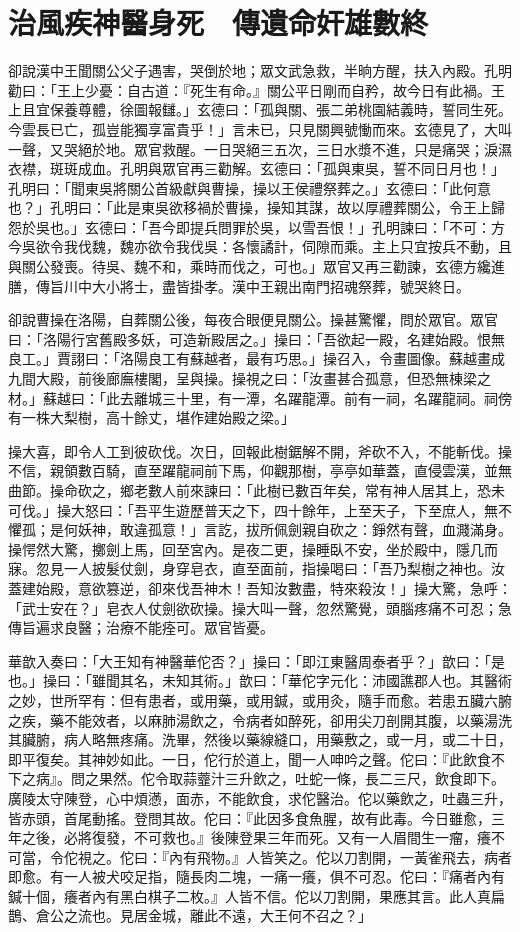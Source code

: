
\chapter{治風疾神醫身死　傳遺命奸雄數終}

卻說漢中王聞關公父子遇害，哭倒於地；眾文武急救，半晌方醒，扶入內殿。孔明勸曰：「王上少憂：自古道：『死生有命。』關公平日剛而自矜，故今日有此禍。王上且宜保養尊體，徐圖報讎。」玄德曰：「孤與關、張二弟桃園結義時，誓同生死。今雲長已亡，孤豈能獨享富貴乎！」言未已，只見關興號慟而來。玄德見了，大叫一聲，又哭絕於地。眾官救醒。一日哭絕三五次，三日水漿不進，只是痛哭；淚濕衣襟，斑斑成血。孔明與眾官再三勸解。玄德曰：「孤與東吳，誓不同日月也！」孔明曰：「聞東吳將關公首級獻與曹操，操以王侯禮祭葬之。」玄德曰：「此何意也？」孔明曰：「此是東吳欲移禍於曹操，操知其謀，故以厚禮葬關公，令王上歸怨於吳也。」玄德曰：「吾今即提兵問罪於吳，以雪吾恨！」孔明諫曰：「不可：方今吳欲令我伐魏，魏亦欲令我伐吳：各懷譎計，伺隙而乘。主上只宜按兵不動，且與關公發喪。待吳、魏不和，乘時而伐之，可也。」眾官又再三勸諫，玄德方纔進膳，傳旨川中大小將士，盡皆掛孝。漢中王親出南門招魂祭葬，號哭終日。

卻說曹操在洛陽，自葬關公後，每夜合眼便見關公。操甚驚懼，問於眾官。眾官曰：「洛陽行宮舊殿多妖，可造新殿居之。」操曰：「吾欲起一殿，名建始殿。恨無良工。」賈詡曰：「洛陽良工有蘇越者，最有巧思。」操召入，令畫圖像。蘇越畫成九間大殿，前後廊廡樓閣，呈與操。操視之曰：「汝畫甚合孤意，但恐無棟梁之材。」蘇越曰：「此去離城三十里，有一潭，名躍龍潭。前有一祠，名躍龍祠。祠傍有一株大梨樹，高十餘丈，堪作建始殿之梁。」

操大喜，即令人工到彼砍伐。次日，回報此樹鋸解不開，斧砍不入，不能斬伐。操不信，親領數百騎，直至躍龍祠前下馬，仰觀那樹，亭亭如華蓋，直侵雲漢，並無曲節。操命砍之，鄉老數人前來諫曰：「此樹已數百年矣，常有神人居其上，恐未可伐。」操大怒曰：「吾平生遊歷普天之下，四十餘年，上至天子，下至庶人，無不懼孤；是何妖神，敢違孤意！」言訖，拔所佩劍親自砍之：錚然有聲，血濺滿身。操愕然大驚，擲劍上馬，回至宮內。是夜二更，操睡臥不安，坐於殿中，隱几而寐。忽見一人披髮仗劍，身穿皂衣，直至面前，指操喝曰：「吾乃梨樹之神也。汝蓋建始殿，意欲篡逆，卻來伐吾神木！吾知汝數盡，特來殺汝！」操大驚，急呼：「武士安在？」皂衣人仗劍欲砍操。操大叫一聲，忽然驚覺，頭腦疼痛不可忍；急傳旨遍求良醫；治療不能痊可。眾官皆憂。

華歆入奏曰：「大王知有神醫華佗否？」操曰：「即江東醫周泰者乎？」歆曰：「是也。」操曰：「雖聞其名，未知其術。」歆曰：「華佗字元化：沛國譙郡人也。其醫術之妙，世所罕有：但有患者，或用藥，或用鍼，或用灸，隨手而愈。若患五臟六腑之疾，藥不能效者，以麻肺湯飲之，令病者如醉死，卻用尖刀剖開其腹，以藥湯洗其臟腑，病人略無疼痛。洗畢，然後以藥線縫口，用藥敷之，或一月，或二十日，即平復矣。其神妙如此。一日，佗行於道上，聞一人呻吟之聲。佗曰：『此飲食不下之病』。問之果然。佗令取蒜虀汁三升飲之，吐蛇一條，長二三尺，飲食即下。廣陵太守陳登，心中煩懣，面赤，不能飲食，求佗醫治。佗以藥飲之，吐蟲三升，皆赤頭，首尾動搖。登問其故。佗曰：『此因多食魚腥，故有此毒。今日雖愈，三年之後，必將復發，不可救也。』後陳登果三年而死。又有一人眉間生一瘤，癢不可當，令佗視之。佗曰：『內有飛物。』人皆笑之。佗以刀割開，一黃雀飛去，病者即愈。有一人被犬咬足指，隨長肉二塊，一痛一癢，俱不可忍。佗曰：『痛者內有鍼十個，癢者內有黑白棋子二枚。』人皆不信。佗以刀割開，果應其言。此人真扁鵲、倉公之流也。見居金城，離此不遠，大王何不召之？」

